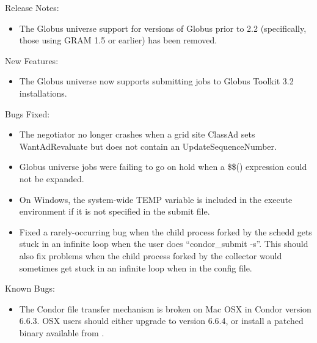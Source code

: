 \noindent Release Notes:

\begin{itemize}

\item The Globus universe support for versions of Globus prior to 2.2 (specifically, those using GRAM 1.5 or earlier) has been removed.

\end{itemize}


\noindent New Features:

\begin{itemize}

\item The Globus universe now supports submitting jobs to Globus Toolkit 3.2 installations.

\end{itemize}

\noindent Bugs Fixed:

\begin{itemize}

\item The negotiator no longer crashes when a grid site ClassAd sets WantAdRevaluate but does not contain an UpdateSequenceNumber.

\item Globus universe jobs were failing to go on hold when a \$\$() expression
could not be expanded.

\item On Windows, the system-wide TEMP variable is included in the
execute environment if it is not specified in the submit file.

\item Fixed a rarely-occurring bug when  the child process forked by the schedd gets stuck in an infinite loop when the user does ``condor\_submit -s''. This should also fix problems when the child process forked by the collector would sometimes get stuck in an infinite loop when  in the config file.

\end{itemize}

\noindent Known Bugs:

\begin{itemize}

\item The Condor file transfer mechanism is broken on Mac OSX in
  Condor version 6.6.3.
  OSX users should either upgrade to version 6.6.4, or install a
  patched  binary available from
  . 

\end{itemize}






